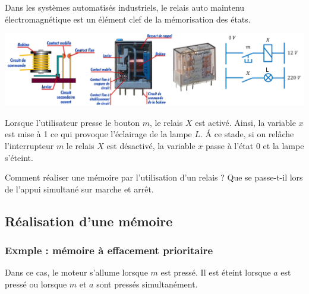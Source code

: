 \documentclass[10pt,fleqn]{article} %
\begin{document}
 Dans les systèmes automatisés industriels, le relais auto maintenu électromagnétique est un élément clef de la mémorisation des états. 

\begin{center}
\includegraphics[width=\textwidth]{images/relais}
\end{center}

Lorsque l'utilisateur presse le bouton $m$, le relais $X$ est activé. Ainsi, la variable $x$ est mise à 1 ce qui provoque l'éclairage de la lampe $L$. \'A ce stade, si on relâche l'interrupteur $m$ le relais $X$ est désactivé, la variable $x$ passe à l'état 0 et la lampe s'éteint.

\begin{obj}
Comment réaliser une mémoire par l'utilisation d'un relais ? 
Que se passe-t-il lors de l'appui simultané sur marche et arrêt. 
\end{obj}

\subsection{Réalisation d'une mémoire}
\subsubsection*{Exmple : mémoire à effacement prioritaire}
Dans ce cas, le moteur s'allume lorsque $m$ est pressé. Il est éteint lorsque $a$ est pressé ou lorsque $m$ et $a$ sont pressés simultanément.
 
\end{document}
